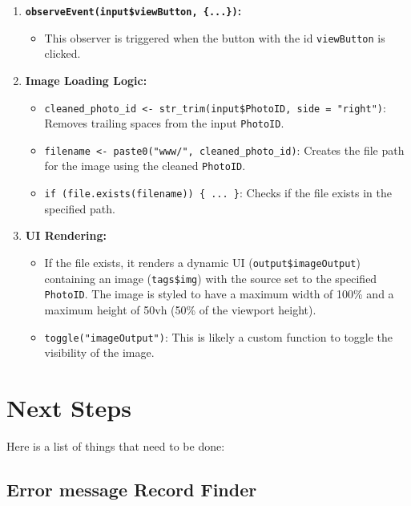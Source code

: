 \documentclass[
]{book}
\providecommand{\tightlist}{%
  \setlength{\itemsep}{0pt}\setlength{\parskip}{0pt}}
\begin{document}
\begin{enumerate}
\def\labelenumi{\arabic{enumi}.}
\tightlist
\item
  \textbf{\texttt{observeEvent(input\$viewButton,\ \{...\})}:}

  \begin{itemize}
  \tightlist
  \item
    This observer is triggered when the button with the id \texttt{viewButton} is clicked.
  \end{itemize}
\item
  \textbf{Image Loading Logic:}

  \begin{itemize}
  \tightlist
  \item
    \texttt{cleaned\_photo\_id\ \textless{}-\ str\_trim(input\$PhotoID,\ side\ =\ "right")}: Removes trailing spaces from the input \texttt{PhotoID}.
  \item
    \texttt{filename\ \textless{}-\ paste0("www/",\ cleaned\_photo\_id)}: Creates the file path for the image using the cleaned \texttt{PhotoID}.
  \item
    \texttt{if\ (file.exists(filename))\ \{\ ...\ \}}: Checks if the file exists in the specified path.
  \end{itemize}
\item
  \textbf{UI Rendering:}

  \begin{itemize}
  \tightlist
  \item
    If the file exists, it renders a dynamic UI (\texttt{output\$imageOutput}) containing an image (\texttt{tags\$img}) with the source set to the specified \texttt{PhotoID}. The image is styled to have a maximum width of 100\% and a maximum height of 50vh (50\% of the viewport height).
  \item
    \texttt{toggle("imageOutput")}: This is likely a custom function to toggle the visibility of the image.
  \end{itemize}
\end{enumerate}

\hypertarget{next-steps}{%
\chapter{Next Steps}\label{next-steps}}

Here is a list of things that need to be done:

\hypertarget{error-message-record-finder}{%
\section{Error message Record Finder}\label{error-message-record-finder}}
\end{document}
